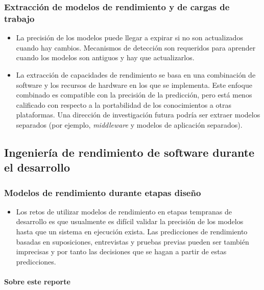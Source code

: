 \subsubsection{Extracción de modelos de rendimiento y de cargas de trabajo}
\begin{itemize}
    \item La precisión de los modelos puede llegar a expirar si no son actualizados cuando hay cambios. Mecanismos de detección son requeridos para aprender cuando los modelos son antiguos y hay que actualizarlos.
    \item La extracción de capacidades de rendimiento se basa en una combinación de software y los recursos de hardware en los que se implementa. Este enfoque combinado es compatible con la precisión de la predicción, pero está menos calificado con respecto a la portabilidad de los conocimientos a otras plataformas. Una dirección de investigación futura podría ser extraer modelos separados (por ejemplo, \emph{middleware} y modelos de aplicación separados). 
\end{itemize}



\subsection{Ingeniería de rendimiento de software durante el desarrollo}

\subsubsection{Modelos de rendimiento durante etapas diseño }
\begin{itemize}
    \item Los retos de utilizar modelos de rendimiento en etapas tempranas de desarrollo es que usualmente es difícil validar la precisión de los modelos hasta que un sistema en ejecución exista. Las predicciones de rendimiento basadas en suposiciones, entrevistas y pruebas previas pueden ser también imprecisas y por tanto las decisiones que se hagan a partir de estas predicciones.
\end{itemize}


\paragraph{Sobre este reporte}





\newpage
